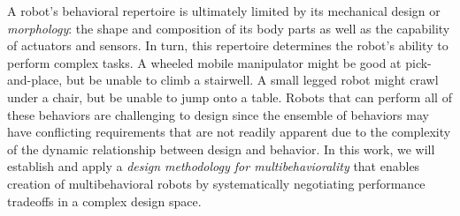 \documentclass[11pt]{article}
\begin{document}
A robot's behavioral repertoire is ultimately limited by its mechanical design or \emph{morphology}: the shape and composition of its body parts as well as the capability of actuators and sensors. 
In turn, this repertoire determines the robot's ability to perform complex tasks. A wheeled mobile manipulator might be good at pick-and-place, but be unable to climb a stairwell. A small legged robot might crawl under a chair, but be unable to jump onto a table. 
Robots that can perform all of these behaviors are challenging to design since the ensemble of behaviors may have conflicting requirements that are not readily apparent due to the complexity of the dynamic relationship between design and behavior.
In this work, we will establish and apply a \emph{design methodology for multibehaviorality} that enables creation of multibehavioral robots by systematically negotiating performance tradeoffs in a complex design space.
\end{document}

